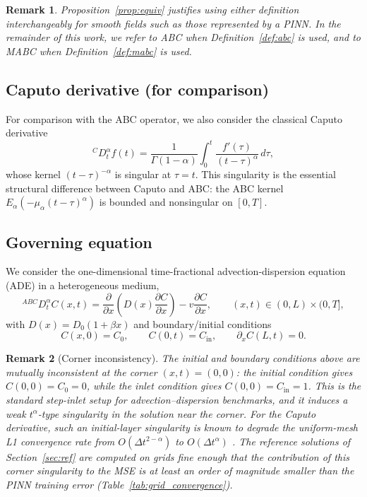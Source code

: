 \documentclass[11pt]{article}
\newtheorem{remark}{Remark}
\begin{document}
\begin{remark}
Proposition~\ref{prop:equiv} justifies using either definition interchangeably for smooth fields such as those represented by a PINN. In the remainder of this work, we refer to \emph{ABC} when Definition~\ref{def:abc} is used, and to \emph{MABC} when Definition~\ref{def:mabc} is used.
\end{remark}

\subsection{Caputo derivative (for comparison)}
\label{sec:caputo}

For comparison with the ABC operator, we also consider the classical Caputo derivative
\begin{equation}
{}^{C}D_t^\alpha f(t)
=
\frac{1}{\Gamma(1-\alpha)}
\int_0^t \frac{f'(\tau)}{(t-\tau)^\alpha}\,d\tau,
\label{eq:caputo}
\end{equation}
whose kernel \((t-\tau)^{-\alpha}\) is singular at \(\tau = t\). This singularity is the essential structural difference between Caputo and ABC: the ABC kernel \(E_\alpha(-\mu_\alpha(t-\tau)^\alpha)\) is bounded and nonsingular on \([0,T]\).

\subsection{Governing equation}
\label{sec:gov}

We consider the one-dimensional time-fractional advection-dispersion equation (ADE) in a heterogeneous medium,
\begin{equation}
{}^{ABC}D_t^\alpha C(x,t)
=
\frac{\partial}{\partial x}\!\left(D(x)\frac{\partial C}{\partial x}\right)
-
v \frac{\partial C}{\partial x},
\qquad (x,t)\in(0,L)\times(0,T],
\label{eq:gov}
\end{equation}
with \(D(x) = D_0(1+\beta x)\) and boundary/initial conditions
\begin{equation}
C(x,0) = C_0, \qquad C(0,t) = C_{\mathrm{in}}, \qquad \partial_x C(L,t) = 0.
\end{equation}
\begin{remark}[Corner inconsistency]
\label{rem:corner}
The initial and boundary conditions above are mutually inconsistent at the corner \((x,t)=(0,0)\): the initial condition gives \(C(0,0)=C_0=0\), while the inlet condition gives \(C(0,0)=C_{\mathrm{in}}=1\).
This is the standard step-inlet setup for advection--dispersion benchmarks, and it induces a weak \(t^{\alpha}\)-type singularity in the solution near the corner.
For the Caputo derivative, such an initial-layer singularity is known to degrade the uniform-mesh L1 convergence rate from \(O(\Delta t^{2-\alpha})\) to \(O(\Delta t^{\alpha})\) \cite{Stynes2017,Jin2016}.
The reference solutions of Section~\ref{sec:ref} are computed on grids fine enough that the contribution of this corner singularity to the MSE is at least an order of magnitude smaller than the PINN training error (Table~\ref{tab:grid_convergence}).
\end{remark}
\end{document}
